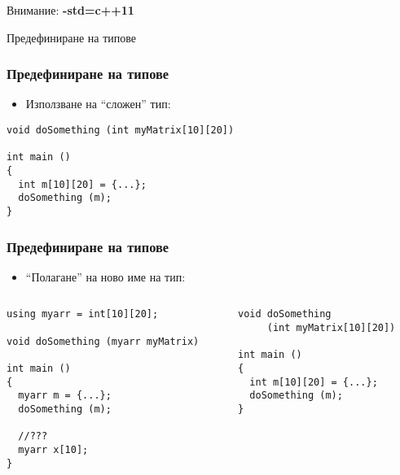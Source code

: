 \documentclass{beamer}
\begin{document}
\begin{frame}
\centerline{Внимание: \textbf{-std=c++11}}
\end{frame}

\begin{frame}
\centerline{Предефиниране на типове}
\end{frame}

\begin{frame}[fragile]
\frametitle{Предефиниране на типове}

\begin{itemize}
  \item Използване на ``сложен'' тип:
\end{itemize}

\begin{flushleft}
\begin{lstlisting}
void doSomething (int myMatrix[10][20])

int main ()
{
  int m[10][20] = {...};
  doSomething (m);
}
\end{lstlisting}	
\end{flushleft}

\end{frame}

\begin{frame}[fragile]
\frametitle{Предефиниране на типове}

\begin{itemize}
  \item ``Полагане'' на ново име на тип:
\end{itemize}



\begin{columns}[t]
  \begin{column}{0.5\textwidth}
\begin{flushleft}
\begin{lstlisting}
using myarr = int[10][20];

void doSomething (myarr myMatrix)

int main ()
{
  myarr m = {...};
  doSomething (m);

  //???
  myarr x[10];
}
\end{lstlisting}  
\end{flushleft}


  \end{column}
  \begin{column}{0.5\textwidth}
\begin{flushleft}
\begin{lstlisting}
void doSomething 
     (int myMatrix[10][20])

int main ()
{
  int m[10][20] = {...};
  doSomething (m);
}
\end{lstlisting}  
\end{flushleft}

  \end{column}
\end{columns}


\end{frame}
\end{document}
